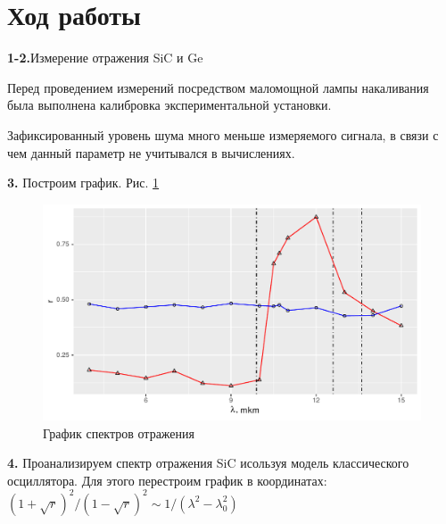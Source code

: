 \documentclass[a4paper,11pt]{report}\usepackage[]{graphicx}\usepackage[]{color}
\makeatletter
\def\maxwidth{ %
  \ifdim\Gin@nat@width>\linewidth
    \linewidth
  \else
    \Gin@nat@width
  \fi
}
\newenvironment{knitrout}{}{} %
\makeatother
\begin{document}
\section*{Ход работы}

\textbf{1-2.}Измерение отражения SiC и Ge

Перед проведением измерений посредством маломощной лампы накаливания была выполнена калибровка экспериментальной установки. 

Зафиксированный уровень шума много меньше измеряемого сигнала, в связи с чем данный параметр не учитывался в вычислениях.

\textbf{3.} Построим график. Рис. \ref{fig:rgraph51}

\begin{knitrout}
\color{fgcolor}\begin{figure}[!h]
\includegraphics[width=\maxwidth]{figure/rgraph51-1} \caption[График спектров отражения]{График спектров отражения}\label{fig:rgraph51}
\end{figure}


\end{knitrout}

\textbf{4.} Проанализируем спектр отражения SiC исользуя модель классического осциллятора. Для этого перестроим график в координатах: $(1+\sqrt{r})^2/(1-\sqrt{r})^2 \sim 1/(\lambda^2-\lambda_0^2) $
\end{document}
